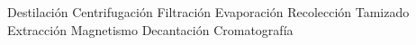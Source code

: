 \begin{minipage}{0.4\linewidth}
    \checkboxchar{ {\color{cadmiumorange}
                $\Box$}
    }
    \begin{checkboxes}
        \choice Destilación         \vspace{0cm}
        \choice Centrifugación      \vspace{0cm}
        \choice Filtración          \vspace{0cm}
        \choice Evaporaci\'on       \vspace{0cm}
        \choice Recolección         \vspace{0cm}
        \choice Tamizado            \vspace{0cm}
        \choice Extracción          \vspace{0cm}
        \choice Magnetismo          \vspace{0cm}
        \choice Decantación         \vspace{0cm}
        \choice Cromatografía
    \end{checkboxes}

\end{minipage}